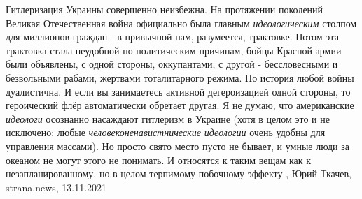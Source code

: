 Гитлеризация Украины совершенно неизбежна.  На протяжении поколений Великая
Отечественная война официально была главным \emph{идеологическим} столпом для
миллионов граждан - в привычной нам, разумеется, трактовке.  Потом эта
трактовка стала неудобной по политическим причинам, бойцы Красной армии были
объявлены, с одной стороны, оккупантами, с другой - бессловесными и безвольными
рабами, жертвами тоталитарного режима.  Но история любой войны дуалистична. И
если вы занимаетесь активной дегероизацией одной стороны, то героический флёр
автоматически обретает другая.  Я не думаю, что американские \emph{идеологи} осознанно
насаждают гитлеризм в Украине (хотя в целом это и не исключено: любые
\emph{человеконенавистнические идеологии} очень удобны для управления массами). Но
просто свято место пусто не бывает, и умные люди за океаном не могут этого не
понимать. И относятся к таким вещам как к незапланированному, но в целом
терпимому побочному эффекту
, 
Юрий Ткачев, strana.news, 13.11.2021

